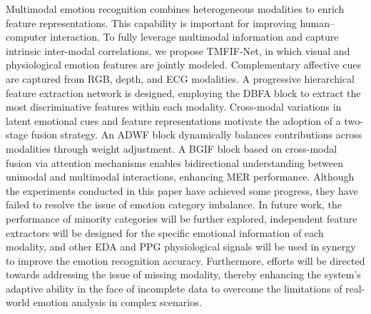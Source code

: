 \documentclass[lettersize,journal]{IEEEtran}
\begin{document}
Multimodal emotion recognition combines heterogeneous modalities to enrich feature representations. This capability is important for improving human–computer interaction. To fully leverage multimodal information and capture intrinsic inter-modal correlations, we propose TMFIF-Net, in which visual and physiological emotion features are jointly modeled. Complementary affective cues are captured from RGB, depth, and ECG modalities. A progressive hierarchical feature extraction network is designed, employing the DBFA block to extract the most discriminative features within each modality. Cross-modal variations in latent emotional cues and feature representations motivate the adoption of a two-stage fusion strategy. An ADWF block dynamically balances contributions across modalities through weight adjustment. A BGIF block based on cross-modal fusion via attention mechanisms enables bidirectional understanding between unimodal and multimodal interactions, enhancing MER performance. Although the experiments conducted in this paper have achieved some progress, they have failed to resolve the issue of emotion category imbalance. In future work, the performance of minority categories will be further explored, independent feature extractors will be designed for the specific emotional information of each modality, and other EDA and PPG physiological signals will be used in synergy to improve the emotion recognition accuracy. Furthermore, efforts will be directed towards addressing the issue of missing modality, thereby enhancing the system's adaptive ability in the face of incomplete data to overcome the limitations of real-world emotion analysis in complex scenarios.
















\vfill
\end{document}
